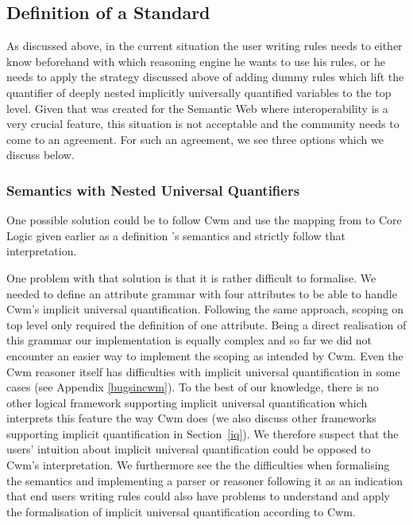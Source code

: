 \subsection{Definition of a Standard}
As discussed above, in the current situation the user writing rules needs to either know beforehand with which reasoning engine he wants to use his rules, or he needs to apply the strategy discussed 
above of adding dummy rules which lift the quantifier of deeply nested implicitly universally quantified variables to the top level. 
Given that \nthreelogic was created for the Semantic Web where interoperability is a very crucial feature, this situation is not acceptable and  
the community needs to come to an agreement. For such an agreement, we see three options which we discuss below.
\subsubsection{Semantics with Nested Universal Quantifiers}
One possible solution could be 
to follow Cwm and use the mapping from \nthree to \nthree Core Logic given earlier as a definition \nthree's semantics and strictly follow that
interpretation. 

One problem with that solution is that it is rather difficult to formalise. 
We needed to define an attribute grammar with four attributes to be able to handle Cwm's implicit universal 
quantification. Following the same approach, scoping on top level only required the definition of one attribute. 
Being a direct realisation of this grammar our implementation is equally complex and so far we did not  encounter an easier way 
to implement the scoping as intended by Cwm.
Even the Cwm reasoner itself has difficulties with implicit universal quantification in some cases (see Appendix \ref{bugsincwm}).
To the best of our knowledge, there is no other logical framework supporting implicit universal quantification
which interprets this feature the way Cwm does (we also discuss other frameworks supporting implicit quantification in Section~\ref{iq}).
We therefore suspect that the users' intuition about implicit universal quantification could be opposed to Cwm's interpretation. %
We furthermore see the
the difficulties when formalising the semantics and implementing a parser or reasoner following it as an indication that end users writing \nthree rules 
could also have problems to 
understand and apply the formalisation of implicit universal quantification according to Cwm. %

